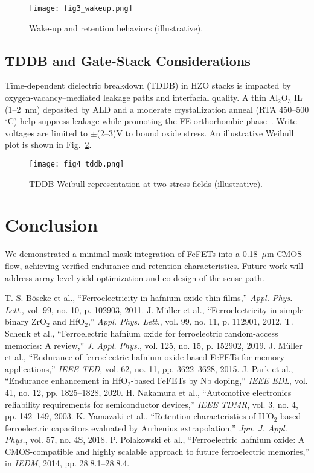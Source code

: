 \documentclass[conference]{IEEEtran}
\begin{document}
\begin{figure}[H]
\centering
\texttt{[image: fig3\_wakeup.png]}
\caption{Wake-up and retention behaviors (illustrative).}
\label{fig:wakeup}
\end{figure}

\subsection{TDDB and Gate-Stack Considerations}
Time-dependent dielectric breakdown (TDDB) in HZO stacks is impacted by oxygen-vacancy–mediated leakage paths and interfacial quality. A thin Al$_2$O$_3$ IL (1–2~nm) deposited by ALD and a moderate crystallization anneal (RTA 450–500$^\circ$C) help suppress leakage while promoting the FE orthorhombic phase~\cite{Muller2015,Park2020}. Write voltages are limited to $\pm$(2–3)V to bound oxide stress. An illustrative Weibull plot is shown in Fig.~\ref{fig:tddb}.

\begin{figure}[H]
\centering
\texttt{[image: fig4\_tddb.png]}
\caption{TDDB Weibull representation at two stress fields (illustrative).}
\label{fig:tddb}
\end{figure}

\section{Conclusion}
We demonstrated a minimal-mask integration of FeFETs into a 0.18~$\mu$m CMOS flow, achieving verified endurance and retention characteristics. Future work will address array-level yield optimization and co-design of the sense path.

\begin{thebibliography}{00}
 T. S. B\"oscke et al., ``Ferroelectricity in hafnium oxide thin films,'' \textit{Appl. Phys. Lett.}, vol. 99, no. 10, p. 102903, 2011.
 J. M\"uller et al., ``Ferroelectricity in simple binary ZrO$_2$ and HfO$_2$,'' \textit{Appl. Phys. Lett.}, vol. 99, no. 11, p. 112901, 2012.
 T. Schenk et al., ``Ferroelectric hafnium oxide for ferroelectric random-access memories: A review,'' \textit{J. Appl. Phys.}, vol. 125, no. 15, p. 152902, 2019.
 J. M\"uller et al., ``Endurance of ferroelectric hafnium oxide based FeFETs for memory applications,'' \textit{IEEE TED}, vol. 62, no. 11, pp. 3622–3628, 2015.
 J. Park et al., ``Endurance enhancement in HfO$_2$-based FeFETs by Nb doping,'' \textit{IEEE EDL}, vol. 41, no. 12, pp. 1825–1828, 2020.
 H. Nakamura et al., ``Automotive electronics reliability requirements for semiconductor devices,'' \textit{IEEE TDMR}, vol. 3, no. 4, pp. 142–149, 2003.
 K. Yamazaki et al., ``Retention characteristics of HfO$_2$-based ferroelectric capacitors evaluated by Arrhenius extrapolation,'' \textit{Jpn. J. Appl. Phys.}, vol. 57, no. 4S, 2018.
 P. Polakowski et al., ``Ferroelectric hafnium oxide: A CMOS-compatible and highly scalable approach to future ferroelectric memories,'' in \textit{IEDM}, 2014, pp. 28.8.1–28.8.4.
\end{thebibliography}
\end{document}
